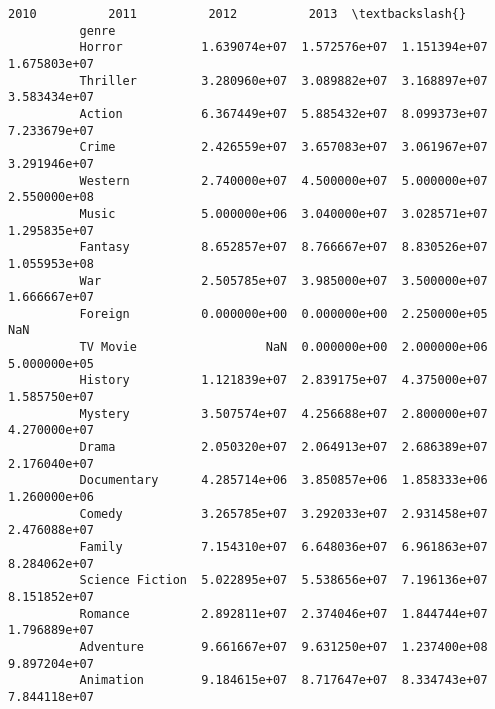 \documentclass[11pt]{article}
\begin{document}
\begin{Verbatim}[commandchars=\\\{\}]
                                   2010          2011          2012          2013  \textbackslash{}
          genre                                                                     
          Horror           1.639074e+07  1.572576e+07  1.151394e+07  1.675803e+07   
          Thriller         3.280960e+07  3.089882e+07  3.168897e+07  3.583434e+07   
          Action           6.367449e+07  5.885432e+07  8.099373e+07  7.233679e+07   
          Crime            2.426559e+07  3.657083e+07  3.061967e+07  3.291946e+07   
          Western          2.740000e+07  4.500000e+07  5.000000e+07  2.550000e+08   
          Music            5.000000e+06  3.040000e+07  3.028571e+07  1.295835e+07   
          Fantasy          8.652857e+07  8.766667e+07  8.830526e+07  1.055953e+08   
          War              2.505785e+07  3.985000e+07  3.500000e+07  1.666667e+07   
          Foreign          0.000000e+00  0.000000e+00  2.250000e+05           NaN   
          TV Movie                  NaN  0.000000e+00  2.000000e+06  5.000000e+05   
          History          1.121839e+07  2.839175e+07  4.375000e+07  1.585750e+07   
          Mystery          3.507574e+07  4.256688e+07  2.800000e+07  4.270000e+07   
          Drama            2.050320e+07  2.064913e+07  2.686389e+07  2.176040e+07   
          Documentary      4.285714e+06  3.850857e+06  1.858333e+06  1.260000e+06   
          Comedy           3.265785e+07  3.292033e+07  2.931458e+07  2.476088e+07   
          Family           7.154310e+07  6.648036e+07  6.961863e+07  8.284062e+07   
          Science Fiction  5.022895e+07  5.538656e+07  7.196136e+07  8.151852e+07   
          Romance          2.892811e+07  2.374046e+07  1.844744e+07  1.796889e+07   
          Adventure        9.661667e+07  9.631250e+07  1.237400e+08  9.897204e+07   
          Animation        9.184615e+07  8.717647e+07  8.334743e+07  7.844118e+07   
          

\end{Verbatim}
\end{document}
